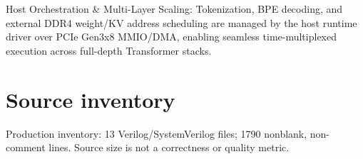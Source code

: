 \documentclass[11pt,a4paper]{article}
\begin{document}
Host Orch\allowbreak{}estr\allowbreak{}atio\allowbreak{}n \& Mult\allowbreak{}i-Laye\allowbreak{}r Scal\allowbreak{}ing: Toke\allowbreak{}niza\allowbreak{}tion,\allowbreak{} BPE deco\allowbreak{}ding,\allowbreak{} and exte\allowbreak{}rnal DDR4 weig\allowbreak{}ht/\allowbreak{}KV addr\allowbreak{}ess sche\allowbreak{}duli\allowbreak{}ng are mana\allowbreak{}ged by the host runt\allowbreak{}ime driv\allowbreak{}er over PCIe Gen3\allowbreak{}x8 MMIO/\allowbreak{}DMA,\allowbreak{} enab\allowbreak{}ling seam\allowbreak{}less time-mult\allowbreak{}iple\allowbreak{}xed exec\allowbreak{}utio\allowbreak{}n acro\allowbreak{}ss full-dept\allowbreak{}h Tran\allowbreak{}sfor\allowbreak{}mer stac\allowbreak{}ks.


\appendix{}\section{Source inventory}

Prod\allowbreak{}ucti\allowbreak{}on inve\allowbreak{}ntor\allowbreak{}y: 13 Veri\allowbreak{}log/\allowbreak{}Syst\allowbreak{}emVe\allowbreak{}rilo\allowbreak{}g file\allowbreak{}s; 1790 nonb\allowbreak{}lank,\allowbreak{} non-comm\allowbreak{}ent line\allowbreak{}s. Sour\allowbreak{}ce size is not a corr\allowbreak{}ectn\allowbreak{}ess or qual\allowbreak{}ity metr\allowbreak{}ic.
\end{document}
